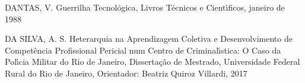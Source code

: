 \documentclass[
12pt,		%
openright,	%
twoside,  %
a4paper,			%
chapter=TITLE,		%
english,			%
french,				%
spanish,			%
brazil				%
]{USPSC-classe/USPSC}
\begin{document}
\begin{flushleft}
\begin{flushleft}
\begin{flushleft}
\begin{flushleft}
\begin{flushleft}
\begin{flushleft}
\begin{flushleft}
\begin{flushleft}
\begin{flushleft}
[DANTAS, 1988] DANTAS, V. Guerrilha Tecnol\'ogica, Livros T\'ecnicos e Cient\'{\i}ficos, janeiro de 1988
\end{flushleft}


\end{flushleft}


\end{flushleft}


\end{flushleft}


\end{flushleft}


\end{flushleft}


\end{flushleft}


\end{flushleft}


\end{flushleft}


\begin{flushleft}
\begin{flushleft}
\begin{flushleft}
\begin{flushleft}
\begin{flushleft}
\begin{flushleft}
\begin{flushleft}
\begin{flushleft}
\begin{flushleft}
[DA SILVA, 2017] DA SILVA, A. S. Heterarquia na Aprendizagem Coletiva e Desenvolvimento de Compet\^encia Profissional Pericial num Centro de Criminal\'{\i}stica: O Caso da Pol\'{\i}cia Militar do Rio de Janeiro, Disserta\c{c}\~ao de Mestrado, Universidade Federal Rural do Rio de Janeiro, Orientador: Beatriz Quiroz Villardi, 2017
\end{flushleft}


\end{flushleft}


\end{flushleft}


\end{flushleft}


\end{flushleft}


\end{flushleft}


\end{flushleft}


\end{flushleft}


\end{flushleft}
\end{document}
